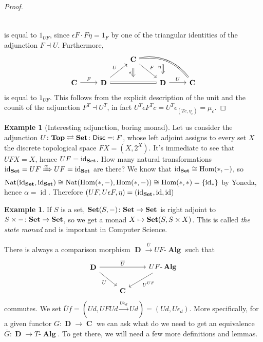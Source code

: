 \documentclass[a4paper,11pt,fullpage,oneside,openany]{amsbook}
\newcommand{\catname}[1]{{\normalfont\textbf{#1}}}
\DeclareMathOperator{\Alg}{\mathbf{Alg}}
\newcommand{\Set}{\catname{Set}}
\DeclareMathOperator{\Hom}{\text{Hom}}
\DeclareMathOperator{\C}{\mathbf{C}}
\DeclareMathOperator{\D}{\mathbf{D}}
\DeclareMathOperator{\id}{id}
\theoremstyle{definition}
\theoremstyle{definition}
\newtheorem{exmp}[thm]{Example} %
\theoremstyle{remark}
\begin{document}
\begin{proof}
\[\begin{tikzcd}
\end{tikzcd}
\]
is equal to $1_{UF}$, since $\epsilon F\cdot F\eta=1_F$ by one of the triangular identities of the adjunction $F\dashv U$. Furthermore,
\[
\begin{tikzcd}
&            &\C \arrow[d, Rightarrow, shorten <= .5em, shorten >= .5em, "\epsilon"']  \arrow[rd, "F"]\arrow[rrd, bend left, equal] &  \arrow[d, Rightarrow, yshift=1ex, shorten <= .5em, shorten >= .01em, "\eta"']           &  \\
\C\arrow[r, "F"]  &\D  \arrow[ru, "U"] \arrow[rr, equal] &  \phantom{.}           &\D  \arrow[r, "U"] & \C
\end{tikzcd}
\] 
is equal to $1_{UF}$. This follows from the explicit description of the unit and the counit of the adjunction $F^T\dashv U^T$, in fact 
$U^T\epsilon F^Tc=U^T\epsilon_{(Tc, \eta_c)}=\mu_c$.
\end{proof}

\begin{exmp}[Interesting adjunction, boring monad] Let us consider the adjunction $U\colon\mathbf{Top}\rightleftarrows\Set\colon\mathsf{Disc}\eqqcolon F$, whose left adjoint assigns to every set $X$ the discrete topological space $FX=(X, 2^X)$.
It's immediate to see that $UFX=X$, hence $UF=\id_\Set$. How many natural transformations $\id_\Set=UF\xRightarrow{\alpha} UF=\id_\Set$ are there?
We know that $\id_\Set\cong\Hom(*,-)$, so $\text{Nat}(\id_\Set, \id_\Set)\cong\text{Nat}(\Hom(*,-),\Hom(*,-))\cong\Hom(*,*)=\{\id_*\}$ by Yoneda, hence $\alpha=\id$. Therefore $(UF,U\epsilon F, \eta)=(\id_\Set, \id, \id)$
\end{exmp}
\begin{exmp}
If $S$ is a set, $\Set(S,-)\colon\Set\to\Set$ is right adjoint to $S\times-\colon\Set\to\Set$, so we get a monad $X\mapsto\Set(S,S\times X)$. This is called \emph{the state monad} and is important in Computer Science.
\end{exmp}
There is always a comparison morphism $\D\xrightarrow{\overline{U}}UF\mbox{-}\Alg$	such that 
\[
\begin{tikzcd}
\D\ar["\overline{U}"]{rr}\ar["U"']{dr}
&& UF\mbox{-}\Alg\ar["U^{UF}", rightarrow]{dl}
\\
& \C
\end{tikzcd}
\]
commutes. We set $\overline{U}f=(Ud,UFUd\xrightarrow{U\epsilon_d}Ud)=(Ud, U\epsilon_d)$. More specifically, for a given functor $G\colon\D\rightarrow\C$ we can ask what do we need to get an equivalence $\overline{G}\colon\D\to T\mbox{-}\Alg$. To get there, we will need a few more definitions and lemmas.
\end{document}
